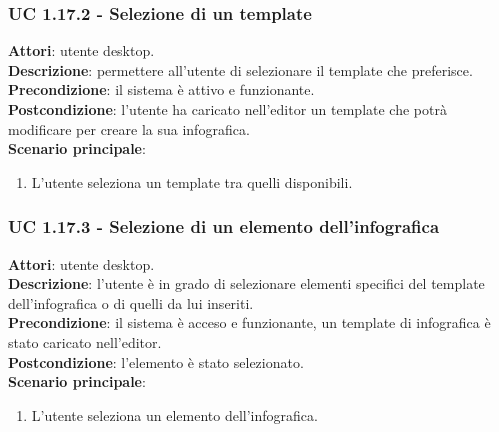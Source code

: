 \subsubsection{UC 1.17.2 - Selezione di un template}{
	\label{uc1.17.2}
	\textbf{Attori}: utente desktop. \\
	\textbf{Descrizione}: permettere all'utente di selezionare il template che preferisce. \\
	\textbf{Precondizione}: il sistema è attivo e funzionante.\\
	\textbf{Postcondizione}: l'utente ha caricato nell'editor un template che potrà modificare per creare la sua infografica.\\
	\textbf{Scenario principale}:
	\begin{enumerate}
		\item L'utente seleziona un template tra quelli disponibili.
	\end{enumerate}	
	}
\subsubsection{UC 1.17.3 - Selezione di un elemento dell'infografica}{
	\label{uc1.17.3}
	\textbf{Attori}: utente desktop. \\
	\textbf{Descrizione}: l'utente è in grado di selezionare elementi specifici del template dell'infografica o di quelli da lui inseriti. \\
	\textbf{Precondizione}: il sistema è acceso e funzionante, un template di infografica è stato caricato nell'editor.	\\
	\textbf{Postcondizione}: l'elemento è stato selezionato.\\
	\textbf{Scenario principale}:
	\begin{enumerate}
		\item L'utente seleziona un elemento dell'infografica.
	\end{enumerate}		
	}
